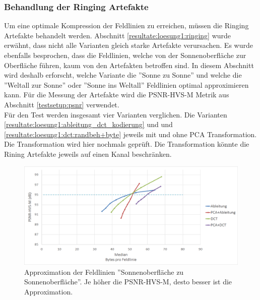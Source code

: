 \subsubsection{Behandlung der Ringing Artefakte} \label{resultate:loesung1:behandlung_ringing}
Um eine optimale Kompression der Feldlinien zu erreichen, müssen die Ringing Artefakte behandelt werden. Abschnitt \ref{resultate:loesung1:ringing} wurde erwähnt, dass nicht alle Varianten gleich starke Artefakte verursachen. Es wurde ebenfalls besprochen, dass die Feldlinien, welche von der Sonnenoberfläche zur Oberfläche führen, kaum von den Artefakten betroffen sind. In diesem Abschnitt wird deshalb erforscht, welche Variante die ''Sonne zu Sonne'' und welche die ''Weltall zur Sonne'' oder ''Sonne ins Weltall'' Feldlinien optimal approximieren kann. Für die Messung der Artefakte wird die PSNR-HVS-M Metrik aus Abschnitt \ref{testsetup:psnr} verwendet.\\
Für den Test werden insgesamt vier Varianten verglichen. Die Varianten \ref{resultate:loesung1:ableitung_dct_kodierung} und und \ref{resultate:loesung1:dct:randbeh+byte} jeweils mit und ohne PCA Transformation. Die Transformation wird hier nochmals geprüft. Die Transformation könnte die Rining Artefakte jeweils auf einen Kanal beschränken.\\
\begin{figure}[!htbp]
	\center	\includegraphics[width=1\textwidth,keepaspectratio]{./pictures/resultate/loesung1/ringing/sts.png}
	\caption{Approximation der Feldlinien ''Sonnenoberfläche zu Sonnenoberfläche''. Je höher die PSNR-HVS-M, desto besser ist die Approximation. }	\label{resultate:loesung1:dct:behandlung_ringing:sts}
\end{figure} 
